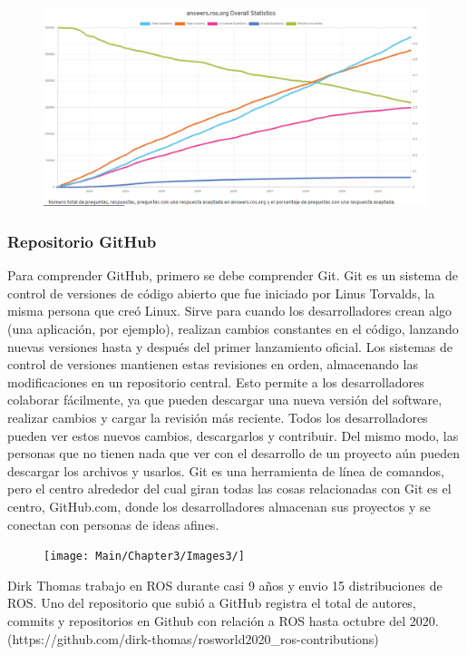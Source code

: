        \begin{figure}[htb]
            \centering
            \includegraphics[width=0.5\linewidth]{Main/Chapter3/Images3/cap3_estadisticas_6.png}
            \caption{}
            \label{f:Cap3-5_estadisticas_7}
        \end{figure}  

        \newpage

        
        \subsubsection{Repositorio GitHub}
            Para comprender GitHub, primero se debe comprender Git. Git es un sistema de control de versiones de código abierto que fue iniciado por Linus Torvalds, la misma persona que creó Linux. Sirve para cuando los desarrolladores crean algo (una aplicación, por ejemplo), realizan cambios constantes en el código, lanzando nuevas versiones hasta y después del primer lanzamiento oficial. Los sistemas de control de versiones mantienen estas revisiones en orden, almacenando las modificaciones en un repositorio central. Esto permite a los desarrolladores colaborar fácilmente, ya que pueden descargar una nueva versión del software, realizar cambios y cargar la revisión más reciente. Todos los desarrolladores pueden ver estos nuevos cambios, descargarlos y contribuir. Del mismo modo, las personas que no tienen nada que ver con el desarrollo de un proyecto aún pueden descargar los archivos y usarlos. Git es una herramienta de línea de comandos, pero el centro alrededor del cual giran todas las cosas relacionadas con Git es el centro, GitHub.com, donde los desarrolladores almacenan sus proyectos y se conectan con personas de ideas afines.
    
            \begin{figure}[htb]
            \centering
            \texttt{[image: Main/Chapter3/Images3/]}
            \caption{}
            \label{f:Cap3-5_estadisticas_8}
            \end{figure} 
        
            Dirk Thomas trabajo en ROS durante casi 9 años y envio 15 distribuciones de ROS. Uno del repositorio que subió a GitHub registra el total de autores, commits y repositorios en Github con relación a ROS hasta octubre del 2020. (https://github.com/dirk-thomas/rosworld2020_ros-contributions)
        
